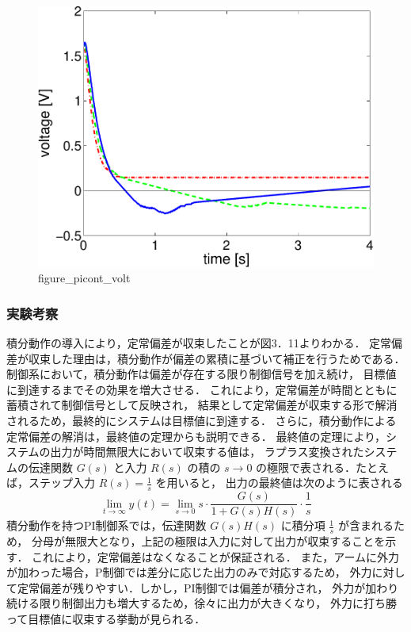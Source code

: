 \begin{figure}[h]
  \centering
  \includegraphics[scale=0.5]{sozai/figure_picont_volt-crop.pdf}
  \caption{figure\_picont\_volt}
\end{figure}

\newpage

\subsubsection{実験考察}
積分動作の導入により，定常偏差が収束したことが図3．11よりわかる．
定常偏差が収束した理由は，積分動作が偏差の累積に基づいて補正を行うためである．
制御系において，積分動作は偏差が存在する限り制御信号を加え続け，
目標値に到達するまでその効果を増大させる．
これにより，定常偏差が時間とともに蓄積されて制御信号として反映され，
結果として定常偏差が収束する形で解消されるため，最終的にシステムは目標値に到達する．
さらに，積分動作による定常偏差の解消は，最終値の定理からも説明できる．
最終値の定理により，システムの出力が時間無限大において収束する値は，
ラプラス変換されたシステムの伝達関数 \( G(s) \) と入力 \( R(s) \) の積の 
\( s \to 0 \) の極限で表される．たとえば，ステップ入力 \( R(s) = \frac{1}{s} \) を用いると，
出力の最終値は次のように表される
\[
  \lim_{t \to \infty} y(t) = \lim_{s \to 0} s \cdot \frac{G(s)}{1 + G(s)H(s)} \cdot \frac{1}{s}
\]
積分動作を持つPI制御系では，伝達関数 \( G(s)H(s) \) に積分項 \(\frac{1}{s}\) が含まれるため，
分母が無限大となり，上記の極限は入力に対して出力が収束することを示す．
これにより，定常偏差はなくなることが保証される．
また，アームに外力が加わった場合，P制御では差分に応じた出力のみで対応するため，
外力に対して定常偏差が残りやすい．しかし，PI制御では偏差が積分され，
外力が加わり続ける限り制御出力も増大するため，徐々に出力が大きくなり，
外力に打ち勝って目標値に収束する挙動が見られる．

